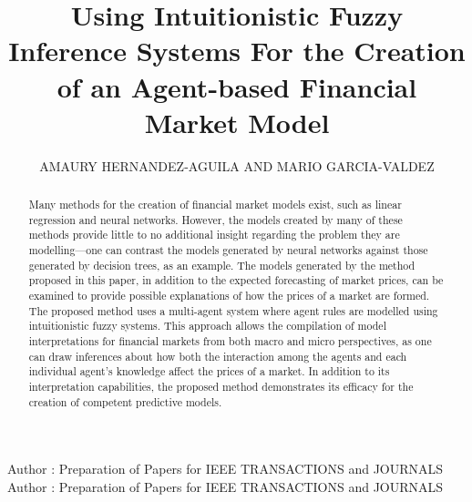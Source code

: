 \documentclass{ieeeaccess}
\begin{document}

\title{Using Intuitionistic Fuzzy Inference Systems For the Creation
of an Agent-based Financial Market Model}
\author{
  \uppercase{Amaury Hernandez-Aguila
    and
    \uppercase{Mario Garcia-Valdez}}}
\address[1]{National Institute of Standards and 
Technology, Boulder, CO 80305 USA (e-mail: author@boulder.nist.gov)}
\address[2]{Department of Physics, Colorado State University, Fort Collins, 
  CO 80523 USA (e-mail: author@lamar.colostate.edu)}

\markboth
{Author \headeretal: Preparation of Papers for IEEE TRANSACTIONS and JOURNALS}
{Author \headeretal: Preparation of Papers for IEEE TRANSACTIONS and JOURNALS}


\begin{abstract}

Many methods for the creation of financial market models exist, such as linear
regression and neural networks. However, the models created by many of these
methods provide little to no additional insight regarding the problem they are
modelling---one can contrast the models generated by neural networks against
those generated by decision trees, as an example. The models generated by the
method proposed in this paper, in addition to the expected forecasting of
market prices, can be examined to provide possible explanations of how the
prices of a market are formed. The proposed method uses a multi-agent system
where agent rules are modelled using intuitionistic fuzzy systems. This
approach allows the compilation of model interpretations for financial markets
from both macro and micro perspectives, as one can draw inferences about how
both the interaction among the agents and each individual agent's knowledge
affect the prices of a market. In addition to its interpretation capabilities,
the proposed method demonstrates its efficacy for the creation of competent
predictive models.
\end{abstract}
\end{document}
